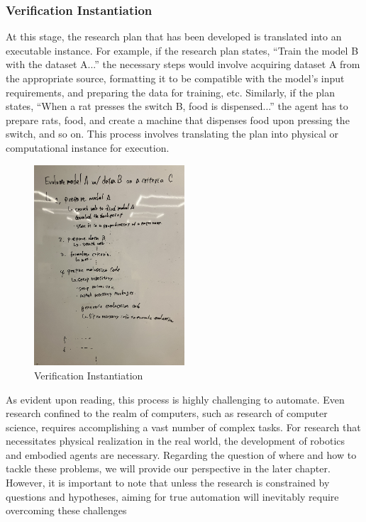 \documentclass{book}
\begin{document}
\subsubsection{Verification Instantiation} 
At this stage, the research plan that has been developed is translated into an executable instance. For example, if the research plan states, ``Train the model B with the dataset A...'' the necessary steps would involve acquiring dataset A from the appropriate source, formatting it to be compatible with the model's input requirements, and preparing the data for training, etc. Similarly, if the plan states, ``When a rat presses the switch B, food is dispensed...'' the agent has to prepare rats, food, and create a machine that dispenses food upon pressing the switch, and so on. This process involves translating the plan into physical or computational instance for execution.

\begin{figure}[htb]
    \centering
    \includegraphics[width=0.5\textwidth]{figs/verification_instantiation.jpg}
    \caption{Verification Instantiation}
    \label{fig:verification_instantiation}
\end{figure}

As evident upon reading, this process is highly challenging to automate. Even research confined to the realm of computers, such as research of computer science, requires accomplishing a vast number of complex tasks. For research that necessitates physical realization in the real world, the development of robotics and embodied agents are necessary. Regarding the question of where and how to tackle these problems, we will provide our perspective in the later chapter. However, it is important to note that unless the research is constrained by questions and hypotheses, aiming for true automation will inevitably require overcoming these challenges
\end{document}
